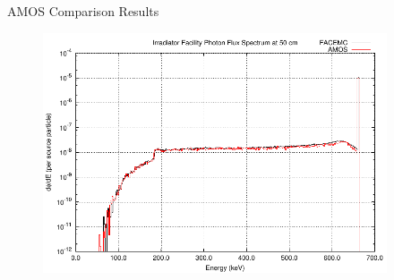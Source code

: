 \documentclass{beamer}
\begin{document}
\begin{frame}{AMOS Comparison Results}

  \begin{figure}[h!]
    \begin{center}
      \includegraphics[width=4in]{figures/facemc_amos_irradiator_comp.pdf}
    \end{center}
  \end{figure}

\end{frame}
\end{document}
